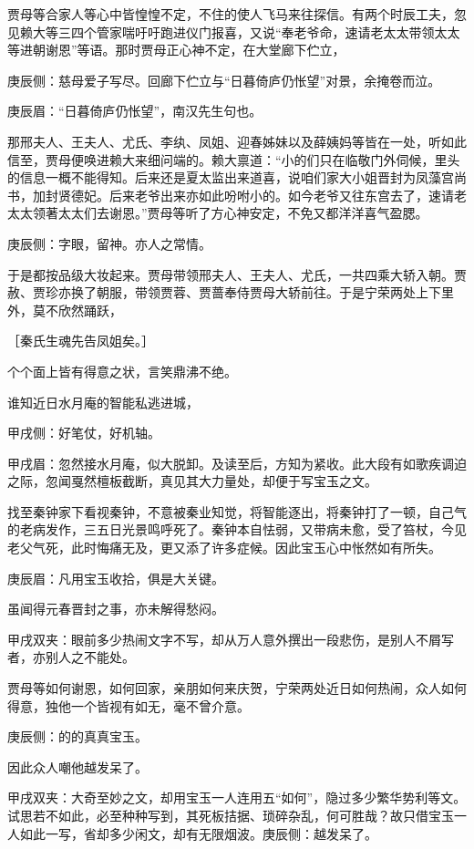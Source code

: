 \begin{parag}
    贾母等合家人等心中皆惶惶不定，不住的使人飞马来往探信。有两个时辰工夫，忽见赖大等三四个管家喘吁吁跑进仪门报喜，又说“奉老爷命，速请老太太带领太太等进朝谢恩”等语。那时贾母正心神不定，在大堂廊下伫立，\begin{note}庚辰侧：慈母爱子写尽。回廊下伫立与“日暮倚庐仍怅望”对景，余掩卷而泣。\end{note}\begin{note}庚辰眉：“日暮倚庐仍怅望”，南汉先生句也。\end{note}那邢夫人、王夫人、尤氏、李纨、凤姐、迎春姊妹以及薛姨妈等皆在一处，听如此信至，贾母便唤进赖大来细问端的。赖大禀道：“小的们只在临敬门外伺候，里头的信息一概不能得知。后来还是夏太监出来道喜，说咱们家大小姐晋封为凤藻宫尚书，加封贤德妃。后来老爷出来亦如此吩咐小的。如今老爷又往东宫去了，速请老太太领著太太们去谢恩。”贾母等听了方心神安定，不免又都洋洋喜气盈腮。\begin{note}庚辰侧：字眼，留神。亦人之常情。\end{note}于是都按品级大妆起来。贾母带领邢夫人、王夫人、尤氏，一共四乘大轿入朝。贾赦、贾珍亦换了朝服，带领贾蓉、贾蔷奉侍贾母大轿前往。于是宁荣两处上下里外，莫不欣然踊跃，\begin{note}［秦氏生魂先告凤姐矣。］\end{note}个个面上皆有得意之状，言笑鼎沸不绝。
\end{parag}


\begin{parag}
    谁知近日水月庵的智能私逃进城，\begin{note}甲戌侧：好笔仗，好机轴。\end{note}\begin{note}甲戌眉：忽然接水月庵，似大脱卸。及读至后，方知为紧收。此大段有如歌疾调迫之际，忽闻戛然檀板截断，真见其大力量处，却便于写宝玉之文。\end{note}找至秦钟家下看视秦钟，不意被秦业知觉，将智能逐出，将秦钟打了一顿，自己气的老病发作，三五日光景鸣呼死了。秦钟本自怯弱，又带病未愈，受了笞杖，今见老父气死，此时悔痛无及，更又添了许多症候。因此宝玉心中怅然如有所失。\begin{note}庚辰眉：凡用宝玉收拾，俱是大关键。\end{note}虽闻得元春晋封之事，亦未解得愁闷。\begin{note}甲戌双夹：眼前多少热闹文字不写，却从万人意外撰出一段悲伤，是别人不屑写者，亦别人之不能处。\end{note}贾母等如何谢恩，如何回家，亲朋如何来庆贺，宁荣两处近日如何热闹，众人如何得意，独他一个皆视有如无，毫不曾介意。\begin{note}庚辰侧：的的真真宝玉。\end{note}因此众人嘲他越发呆了。\begin{note}甲戌双夹：大奇至妙之文，却用宝玉一人连用五“如何”，隐过多少繁华势利等文。试思若不如此，必至种种写到，其死板拮据、琐碎杂乱，何可胜哉？故只借宝玉一人如此一写，省却多少闲文，却有无限烟波。庚辰侧：越发呆了。\end{note}
\end{parag}


